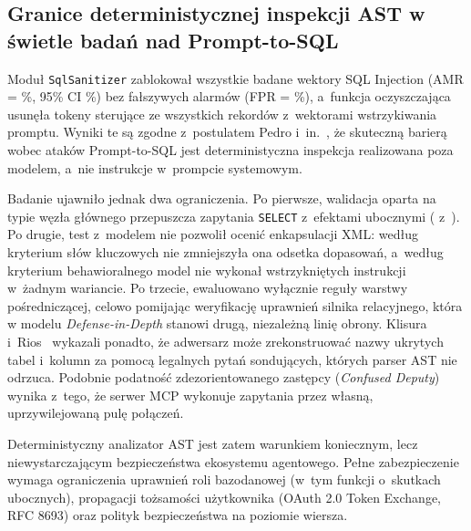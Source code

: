 \subsection{Granice deterministycznej inspekcji AST w świetle badań nad Prompt-to-SQL}
\label{subsec:wyniki_polemika_bezpieczenstwo}

Moduł \texttt{SqlSanitizer} zablokował wszystkie badane wektory SQL Injection (AMR = \wynAmr\%, 95\% CI \wynAmrCi\%) bez fałszywych alarmów (FPR = \wynFpr\%), a~funkcja oczyszczająca usunęła tokeny sterujące ze wszystkich rekordów z~wektorami wstrzykiwania promptu. Wyniki te są zgodne z~postulatem Pedro i~in.~\cite{pedro2023prompt2sql}, że skuteczną barierą wobec ataków Prompt-to-SQL jest deterministyczna inspekcja realizowana poza modelem, a~nie instrukcje w~prompcie systemowym.

Badanie ujawniło jednak dwa ograniczenia. Po pierwsze, walidacja oparta na typie węzła głównego przepuszcza zapytania \texttt{SELECT} z~efektami ubocznymi (\wynSideK{} z~\wynSecSideEffect). Po drugie, test z~modelem nie pozwolił ocenić enkapsulacji XML: według kryterium słów kluczowych nie zmniejszyła ona odsetka dopasowań, a~według kryterium behawioralnego model nie wykonał wstrzykniętych instrukcji w~żadnym wariancie. Po trzecie, ewaluowano wyłącznie reguły warstwy pośredniczącej, celowo pomijając weryfikację uprawnień silnika relacyjnego, która w modelu \emph{Defense-in-Depth} stanowi drugą, niezależną linię obrony. Klisura i~Rios~\cite{klisura2024unmasking} wykazali ponadto, że adwersarz może zrekonstruować nazwy ukrytych tabel i~kolumn za pomocą legalnych pytań sondujących, których parser AST nie odrzuca. Podobnie podatność zdezorientowanego zastępcy (\emph{Confused Deputy}) wynika z~tego, że serwer MCP wykonuje zapytania przez własną, uprzywilejowaną pulę połączeń.

Deterministyczny analizator AST jest zatem warunkiem koniecznym, lecz niewystarczającym bezpieczeństwa ekosystemu agentowego. Pełne zabezpieczenie wymaga ograniczenia uprawnień roli bazodanowej (w~tym funkcji o~skutkach ubocznych), propagacji tożsamości użytkownika (OAuth 2.0 Token Exchange, RFC 8693) oraz polityk bezpieczeństwa na poziomie wiersza.
